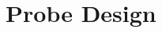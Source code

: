 \documentclass[preprint,5p]{elsarticle}
\begin{document}
\section{Probe Design}
\label{sec:probe-design}
\cbstart\
\end{document}
